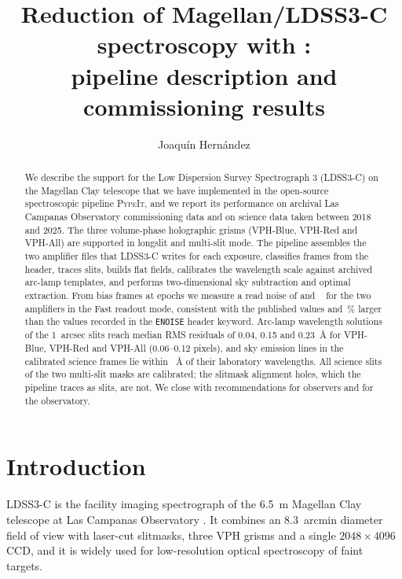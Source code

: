\documentclass[11pt,a4paper]{article}
\title{Reduction of Magellan/LDSS3-C spectroscopy with \pypeit:\\
       pipeline description and commissioning results}
\author{Joaqu\'in Hern\'andez}
\date{\reportdate}
\newcommand{\pypeit}{\textsc{PypeIt}}
\newcommand{\code}[1]{\texttt{#1}}
\begin{document}
\maketitle

\begin{abstract}
\noindent
We describe the support for the Low Dispersion Survey Spectrograph 3 (LDSS3-C)
on the Magellan Clay telescope that we have implemented in the open-source
spectroscopic pipeline \pypeit{}, and we report its performance on archival
Las Campanas Observatory commissioning data and on science data taken between
2018 and 2025. The three volume-phase holographic grisms (VPH-Blue, VPH-Red
and VPH-All) are supported in longslit and multi-slit mode. The pipeline
assembles the two amplifier files that LDSS3-C writes for each exposure,
classifies frames from the header, traces slits, builds flat fields,
calibrates the wavelength scale against archived arc-lamp templates, and
performs two-dimensional sky subtraction and optimal extraction. From bias
frames at \nBiasEpochs{} epochs we measure a read noise of
\ronAmpOne{} and \ronAmpTwo{}~\si{\electron} for the two amplifiers in the
Fast readout mode, consistent with the published values and
\ronExcessRange\,\% larger than the values recorded in the
\code{ENOISE} header keyword.
Arc-lamp wavelength solutions of the \SI{1}{arcsec} slits reach median RMS
residuals of 0.04, 0.15 and 0.23~\AA{} for VPH-Blue, VPH-Red and VPH-All
(0.06--0.12 pixels), and sky emission lines in the calibrated science frames lie
within \skyOffsetMax~\AA{} of their laboratory wavelengths. All science slits of
the two multi-slit masks are calibrated; the slitmask alignment holes, which the
pipeline traces as slits, are not. We close with recommendations for observers
and for the observatory.
\end{abstract}

\tableofcontents
\clearpage

\section{Introduction}
\label{sec:intro}

LDSS3-C is the facility imaging spectrograph of the \SI{6.5}{\metre} Magellan
Clay telescope at Las Campanas Observatory \citep{LDSS3manual}. It combines an
\SI{8.3}{arcmin} diameter field of view with laser-cut slitmasks, three VPH
grisms and a single $2048\times4096$ CCD, and it is widely used
for low-resolution optical spectroscopy of faint targets.
\end{document}
